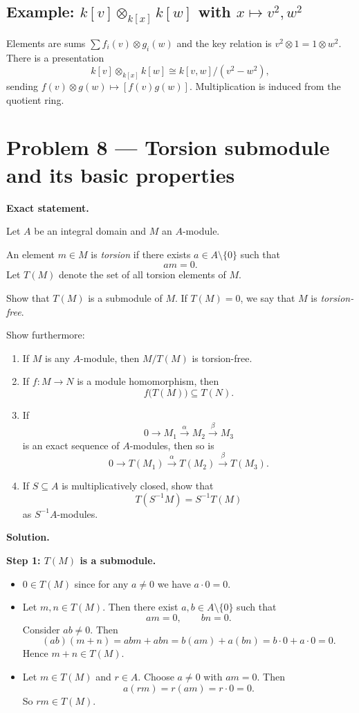 \documentclass[12pt,a4paper]{article}
\theoremstyle{plain}
\theoremstyle{definition}      %
\begin{document}
	\subsection*{Example: \(k[v]\otimes_{k[x]}k[w]\) with \(x\mapsto v^2,w^2\)}
	Elements are sums \(\sum f_i(v)\otimes g_i(w)\) and the key relation is \(v^2\otimes 1=1\otimes w^2\).
	There is a presentation
	\[
	k[v]\otimes_{k[x]}k[w]\cong k[v,w]/(v^2-w^2),
	\]
	sending \(f(v)\otimes g(w)\mapsto [f(v)g(w)]\). Multiplication is induced from the quotient ring.
	
	
\section*{Problem 8 — Torsion submodule and its basic properties}

\textbf{Exact statement.}

Let \(A\) be an integral domain and \(M\) an \(A\)-module.

An element \(m\in M\) is \emph{torsion} if there exists \(a\in A\setminus\{0\}\) such that
\[
am=0.
\]
Let \(T(M)\) denote the set of all torsion elements of \(M\).

Show that \(T(M)\) is a submodule of \(M\).
If \(T(M)=0\), we say that \(M\) is \emph{torsion-free}.

Show furthermore:

\begin{enumerate}
	\item[(a)] If \(M\) is any \(A\)-module, then \(M/T(M)\) is torsion-free.
	
	\item[(b)] If \(f:M\to N\) is a module homomorphism, then
	\[
	f\bigl(T(M)\bigr)\subseteq T(N).
	\]
	
	\item[(c)] If
	\[
	0\longrightarrow M_{1}\xrightarrow{\ \alpha\ } M_{2}\xrightarrow{\ \beta\ } M_{3}
	\]
	is an exact sequence of \(A\)-modules, then so is
	\[
	0\longrightarrow T(M_{1})\xrightarrow{\ \alpha\ } T(M_{2})\xrightarrow{\ \beta\ } T(M_{3}).
	\]
	
	\item[(d)] If \(S\subseteq A\) is multiplicatively closed, show that
	\[
	T\!\left(S^{-1}M\right)=S^{-1}T(M)
	\]
	as \(S^{-1}A\)-modules.
\end{enumerate}

\bigskip
\textbf{Solution.}

\textbf{Step 1: \(T(M)\) is a submodule.}

\begin{itemize}
	\item \(0\in T(M)\) since for any \(a\neq 0\) we have \(a\cdot 0=0\).
	
	\item Let \(m,n\in T(M)\).
	Then there exist \(a,b\in A\setminus\{0\}\) such that
	\[
	am=0,
	\qquad
	bn=0.
	\]
	Consider \(ab\neq 0\). Then
	\[
	(ab)(m+n)=abm+abn=b(am)+a(bn)=b\cdot 0+a\cdot 0=0.
	\]
	Hence \(m+n\in T(M)\).
	
	\item Let \(m\in T(M)\) and \(r\in A\).
	Choose \(a\neq 0\) with \(am=0\). Then
	\[
	a(rm)=r(am)=r\cdot 0=0.
	\]
	So \(rm\in T(M)\).
\end{itemize}
\end{document}
